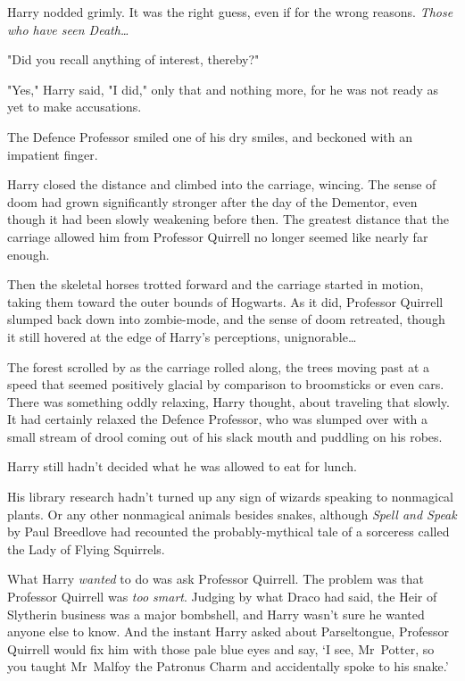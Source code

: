 Harry nodded grimly. It was the right guess, even if for the wrong reasons.
\emph{Those who have seen Death…}

"Did you recall anything of interest, thereby?"

"Yes," Harry said, "I did," only that and nothing more, for he was not ready as
yet to make accusations.

The Defence Professor smiled one of his dry smiles, and beckoned with an
impatient finger.

Harry closed the distance and climbed into the carriage, wincing. The sense of
doom had grown significantly stronger after the day of the Dementor, even
though it had been slowly weakening before then. The greatest distance that the
carriage allowed him from Professor Quirrell no longer seemed like nearly far
enough.

Then the skeletal horses trotted forward and the carriage started in motion,
taking them toward the outer bounds of Hogwarts. As it did, Professor Quirrell
slumped back down into zombie-mode, and the sense of doom retreated, though it
still hovered at the edge of Harry's perceptions, unignorable…

The forest scrolled by as the carriage rolled along, the trees moving past at a
speed that seemed positively glacial by comparison to broomsticks or even cars.
There was something oddly relaxing, Harry thought, about traveling that slowly.
It had certainly relaxed the Defence Professor, who was slumped over with a
small stream of drool coming out of his slack mouth and puddling on his robes.

Harry still hadn't decided what he was allowed to eat for lunch.

His library research hadn't turned up any sign of wizards speaking to
nonmagical plants. Or any other nonmagical animals besides snakes, although
\emph{Spell and Speak} by Paul Breedlove had recounted the probably-mythical
tale of a sorceress called the Lady of Flying Squirrels.

What Harry \emph{wanted} to do was ask Professor Quirrell. The problem was that
Professor Quirrell was \emph{too smart}. Judging by what Draco had said, the
Heir of Slytherin business was a major bombshell, and Harry wasn't sure he
wanted anyone else to know. And the instant Harry asked about Parseltongue,
Professor Quirrell would fix him with those pale blue eyes and say, `I see,
Mr~Potter, so you taught Mr~Malfoy the Patronus Charm and accidentally spoke
to his snake.'

